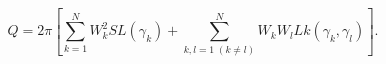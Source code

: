 \begin{equation}
Q=2\pi [\sum_{k=1}^NW_k^2SL(\gamma _k)+\sum_{k,l=1\;(k\neq
l)}^NW_kW_lLk(\gamma _k,\gamma _l)].  \label{CSact9}
\end{equation}

